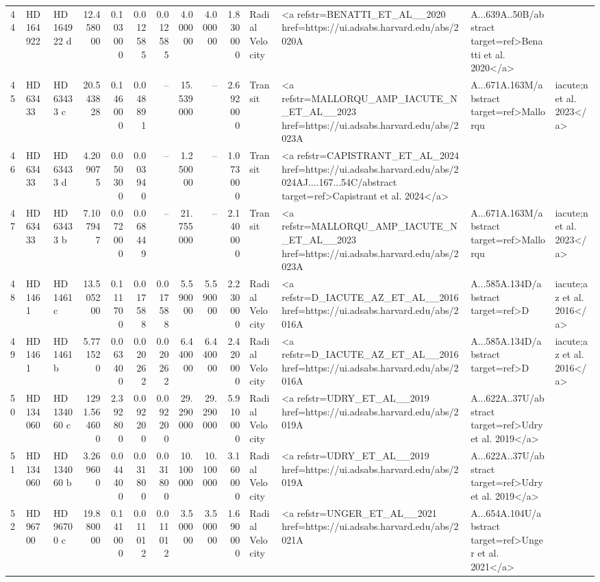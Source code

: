 \begin{tabular}{lllrrrrrrrll}
44 & HD 164922 & HD 164922 d & 12.458000 & 0.103000 & 0.012585 & 0.012585 & 4.000000 & 4.000000 & 1.830000 & Radial Velocity & <a refstr=BENATTI_ET_AL__2020 href=https://ui.adsabs.harvard.edu/abs/2020A&A...639A..50B/abstract target=ref>Benatti et al. 2020</a> \\
45 & HD 63433 & HD 63433 c & 20.543828 & 0.146000 & 0.048891 & -- & 15.539000 & -- & 2.692000 & Transit & <a refstr=MALLORQU_AMP_IACUTE_N_ET_AL__2023 href=https://ui.adsabs.harvard.edu/abs/2023A&A...671A.163M/abstract target=ref>Mallorqu&iacute;n et al. 2023</a> \\
46 & HD 63433 & HD 63433 d & 4.209075 & 0.050300 & 0.003940 & -- & 1.250000 & -- & 1.073000 & Transit & <a refstr=CAPISTRANT_ET_AL_2024 href=https://ui.adsabs.harvard.edu/abs/2024AJ....167...54C/abstract target=ref>Capistrant et al. 2024</a> \\
47 & HD 63433 & HD 63433 b & 7.107947 & 0.072000 & 0.068449 & -- & 21.755000 & -- & 2.140000 & Transit & <a refstr=MALLORQU_AMP_IACUTE_N_ET_AL__2023 href=https://ui.adsabs.harvard.edu/abs/2023A&A...671A.163M/abstract target=ref>Mallorqu&iacute;n et al. 2023</a> \\
48 & HD 1461 & HD 1461 c & 13.505200 & 0.111700 & 0.017588 & 0.017588 & 5.590000 & 5.590000 & 2.230000 & Radial Velocity & <a refstr=D_IACUTE_AZ_ET_AL__2016 href=https://ui.adsabs.harvard.edu/abs/2016A&A...585A.134D/abstract target=ref>D&iacute;az et al. 2016</a> \\
49 & HD 1461 & HD 1461 b & 5.771520 & 0.063400 & 0.020262 & 0.020262 & 6.440000 & 6.440000 & 2.420000 & Radial Velocity & <a refstr=D_IACUTE_AZ_ET_AL__2016 href=https://ui.adsabs.harvard.edu/abs/2016A&A...585A.134D/abstract target=ref>D&iacute;az et al. 2016</a> \\
50 & HD 134060 & HD 134060 c & 1291.564600 & 2.392800 & 0.092200 & 0.092200 & 29.290000 & 29.290000 & 5.910000 & Radial Velocity & <a refstr=UDRY_ET_AL__2019 href=https://ui.adsabs.harvard.edu/abs/2019A&A...622A..37U/abstract target=ref>Udry et al. 2019</a> \\
51 & HD 134060 & HD 134060 b & 3.269600 & 0.044400 & 0.031800 & 0.031800 & 10.100000 & 10.100000 & 3.160000 & Radial Velocity & <a refstr=UDRY_ET_AL__2019 href=https://ui.adsabs.harvard.edu/abs/2019A&A...622A..37U/abstract target=ref>Udry et al. 2019</a> \\
52 & HD 96700 & HD 96700 c & 19.880000 & 0.141000 & 0.011012 & 0.011012 & 3.500000 & 3.500000 & 1.690000 & Radial Velocity & <a refstr=UNGER_ET_AL__2021 href=https://ui.adsabs.harvard.edu/abs/2021A&A...654A.104U/abstract target=ref>Unger et al. 2021</a> \\

\end{tabular}
